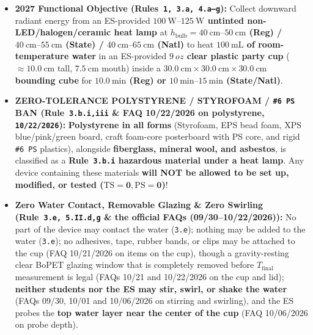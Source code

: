 \documentclass[10pt,twoside,openany,letterpaper]{book}
\begin{document}
\begin{rulebox}
\begin{itemize}
  \item \textbf{2027 Functional Objective (Rules~\texttt{1, 3.a, 4.a--g}):} Collect downward radiant energy from an ES-provided \textbf{$\SIrange{100}{125}{\watt}$ untinted non-LED/halogen/ceramic heat lamp} at \textbf{$h_{\mathrm{bulb}} = \SIrange{40}{50}{\centi\meter}$ (Reg) / $\SIrange{40}{55}{\centi\meter}$ (State) / $\SIrange{40}{65}{\centi\meter}$ (Natl)} to heat \textbf{$\SI{100}{\milli\liter}$ of room-temperature water} in an ES-provided \textbf{$\SI{9}{oz}$ clear plastic party cup} ($\approx\SI{10.0}{\centi\meter}$ tall, $\SI{7.5}{\centi\meter}$ mouth) inside a \textbf{$\SI{30.0}{\centi\meter}\times\SI{30.0}{\centi\meter}\times\SI{30.0}{\centi\meter}$ bounding cube} for \textbf{$\SI{10.0}{\minute}$ (Reg) or $\SIrange{10}{15}{\minute}$ (State/Natl)}.
  \item \textbf{\textcolor{rust}{ZERO-TOLERANCE POLYSTYRENE / STYROFOAM / \texttt{\#6~PS} BAN (Rule~\texttt{3.b.i,iii} \& FAQ 10/22/2026 on polystyrene, \texttt{10/22/2026}):}} \textbf{Polystyrene in all forms} (Styrofoam, EPS bead foam, XPS blue/pink/green board, craft foam-core posterboard with PS core, and rigid \texttt{\#6~PS} plastics), alongside \textbf{fiberglass, mineral wool, and asbestos}, is classified as a \textbf{Rule~\texttt{3.b.i} hazardous material under a heat lamp}. Any device containing these materials \textbf{will NOT be allowed to be set up, modified, or tested ($\mathbf{\mathrm{TS}=0, \mathrm{PS}=0}$)}!
  \item \textbf{Zero Water Contact, Removable Glazing \& Zero Swirling (Rule~\texttt{3.e, 5.II.d,g} \& the official FAQs (09/30--10/22/2026)):} No part of the device may contact the water (\texttt{3.e}); nothing may be added to the water (\texttt{3.e}); no adhesives, tape, rubber bands, or clips may be attached to the cup (FAQ 10/21/2026 on items on the cup), though a gravity-resting clear BoPET glazing window that is completely removed before $T_{\mathrm{final}}$ measurement is legal (FAQs 10/21 and 10/22/2026 on the cup and lid); \textbf{neither students nor the ES may stir, swirl, or shake the water} (FAQs 09/30, 10/01 and 10/06/2026 on stirring and swirling), and the ES probes the \textbf{top water layer near the center of the cup} (FAQ 10/06/2026 on probe depth).
\end{itemize}
\end{rulebox}
\end{document}
